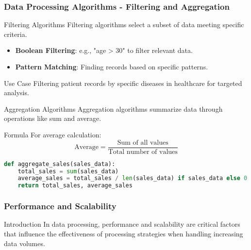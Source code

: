 \documentclass[aspectratio=169]{beamer}
\begin{document}
\begin{frame}[fragile]
    \frametitle{Data Processing Algorithms - Filtering and Aggregation}
    \begin{block}{Filtering Algorithms}
        Filtering algorithms select a subset of data meeting specific criteria.
    \end{block}
    \begin{itemize}
        \item \textbf{Boolean Filtering}: e.g., "age > 30" to filter relevant data.
        \item \textbf{Pattern Matching}: Finding records based on specific patterns.
    \end{itemize}
    \begin{block}{Use Case}
        Filtering patient records by specific diseases in healthcare for targeted analysis.
    \end{block}
    \begin{block}{Aggregation Algorithms}
        Aggregation algorithms summarize data through operations like sum and average.
    \end{block}
    \begin{block}{Formula}
        For average calculation:
        \begin{equation}
        \text{Average} = \frac{\text{Sum of all values}}{\text{Total number of values}}
        \end{equation}
    \end{block}
    \begin{lstlisting}[language=Python]
def aggregate_sales(sales_data):
    total_sales = sum(sales_data)
    average_sales = total_sales / len(sales_data) if sales_data else 0
    return total_sales, average_sales
    \end{lstlisting}
\end{frame}

\begin{frame}
    \frametitle{Performance and Scalability}
    \begin{block}{Introduction}
        In data processing, performance and scalability are critical factors that influence the effectiveness of processing strategies when handling increasing data volumes. 
    \end{block}
\end{frame}
\end{document}
